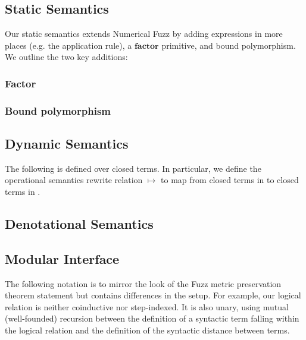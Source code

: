 

\subsection{Static Semantics}
Our static semantics extends Numerical Fuzz by adding expressions in more places
(e.g. the application rule), a $\textbf{factor}$ primitive, and bound
polymorphism. We outline the two key additions:

\subsubsection*{Factor}

\subsubsection*{Bound polymorphism}



\subsection{Dynamic Semantics}
The following is defined over closed terms. In particular, we define the
operational semantics rewrite relation $\mapsto$ to map from closed terms in
\Lang to closed terms in \Lang.



\subsection{Denotational Semantics}


\subsection{Modular Interface}
The following notation is to mirror the look of the Fuzz metric preservation
theorem statement but contains differences in the setup. For example, our
logical relation is neither coinductive nor step-indexed. It is also unary,
using mutual (well-founded) recursion between the definition of a syntactic term
falling within the logical relation and the definition of the syntactic distance
between terms.

